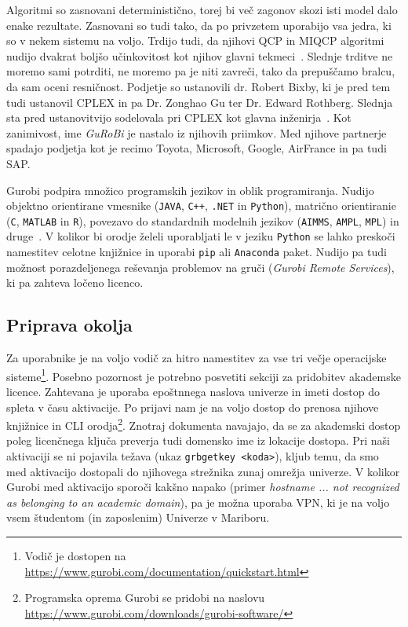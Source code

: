 \documentclass[a4paper,11pt]{article}
\begin{document}
Algoritmi so zasnovani deterministično, torej bi več zagonov skozi isti model dalo enake rezultate. Zasnovani so tudi tako, da po privzetem uporabijo vsa jedra, ki so v nekem sistemu na voljo. Trdijo tudi, da njihovi QCP in MIQCP algoritmi nudijo dvakrat boljšo učinkovitost kot njihov glavni tekmeci~\cite{GurobiBrochure:2020}. Slednje trditve ne moremo  sami potrditi, ne moremo pa je niti zavreči, tako da prepuščamo bralcu, da sam oceni resničnost. Podjetje so ustanovili dr. Robert Bixby, ki je pred tem tudi ustanovil CPLEX in pa Dr. Zonghao 	Gu ter Dr. Edward Rothberg. Slednja sta pred ustanovitvijo sodelovala pri CPLEX kot glavna inženirja~\cite{GurobiTeam:2020}. Kot zanimivost, ime \textit{GuRoBi} je nastalo iz njihovih priimkov. Med njihove partnerje spadajo podjetja kot je recimo Toyota, Microsoft, Google, AirFrance in pa tudi SAP.

Gurobi podpira množico programskih jezikov in oblik programiranja. Nudijo objektno orientirane vmesnike (\texttt{JAVA}, \texttt{C++}, \texttt{.NET} in \texttt{Python}), matrično orientiranie (\texttt{C}, \texttt{MATLAB} in \texttt{R}), povezavo do standardnih modelnih jezikov (\texttt{AIMMS}, \texttt{AMPL}, \texttt{MPL}) in druge~\cite{GurobiOptimizer:2020}. V kolikor bi orodje želeli uporabljati le v jeziku \texttt{Python} se lahko preskoči namestitev celotne knjižnice in uporabi \texttt{pip} ali \texttt{Anaconda} paket. Nudijo pa tudi možnost porazdeljenega reševanja problemov na gruči (\textit{Gurobi Remote Services}), ki pa zahteva ločeno licenco.

\subsection{Priprava okolja}

Za uporabnike je na voljo vodič za hitro namestitev za vse tri večje operacijske sisteme\footnote{Vodič je dostopen na \url{https://www.gurobi.com/documentation/quickstart.html}}. Posebno pozornost je potrebno posvetiti sekciji za pridobitev akademske licence. Zahtevana je uporaba epoštnnega naslova univerze in imeti dostop do spleta v času aktivacije. Po prijavi nam je na voljo dostop do prenosa njihove knjižnice in CLI orodja\footnote{Programska oprema Gurobi se pridobi na naslovu \url{https://www.gurobi.com/downloads/gurobi-software/}}. Znotraj dokumenta navajajo, da se za akademski dostop poleg licenčnega ključa preverja tudi domensko ime iz lokacije dostopa. Pri naši aktivaciji se ni pojavila težava (ukaz \texttt{grbgetkey \textless koda\textgreater}), kljub temu, da smo med aktivacijo dostopali do njihovega strežnika zunaj omrežja univerze. V kolikor Gurobi med aktivacijo sporoči kakšno napako (primer \textit{hostname ... not recognized as belonging to an academic domain}), pa je možna uporaba VPN, ki je na voljo vsem študentom (in zaposlenim) Univerze v Mariboru.
\end{document}
